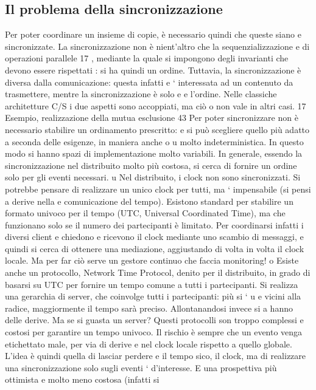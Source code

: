 \documentclass[a4paper,12pt]{article}
\begin{document}
\subsection{Il problema della sincronizzazione}
Per poter coordinare un insieme di copie, è necessario quindi che queste siano
e
sincronizzate. La sincronizzazione non è nient'altro che la sequenzializzazione
e
di operazioni parallele 17 , mediante la quale si impongono degli invarianti che
devono essere rispettati : si ha quindi un ordine.
Tuttavia, la sincronizzazione è diversa dalla comunicazione: questa infatti
e
` interessata ad un contenuto da trasmettere, mentre la sincronizzazione è solo
e
e
l'ordine. Nelle classiche architetture C/S i due aspetti sono accoppiati, ma ciò
o
non vale in altri casi.
17 Esempio,
realizzazione della mutua esclusione
43
Per poter sincronizzare non è necessario stabilire un ordinamento prescritto:
e
si può scegliere quello più adatto a seconda delle esigenze, in maniera anche
o
u
molto indeterministica. In questo modo si hanno spazi di implementazione
molto variabili. In generale, essendo la sincronizzazione nel distribuito molto
più costosa, si cerca di fornire un ordine solo per gli eventi necessari.
u
Nel distribuito, i clock non sono sincronizzati. Si potrebbe pensare di realizzare un unico clock per tutti, ma `
impensabile (si pensi a derive nella
e
comunicazione del tempo). Esistono standard per stabilire un formato univoco per il tempo (UTC, Universal Coordinated
Time), ma che funzionano solo
se il numero dei partecipanti è limitato. Per coordinarsi infatti i diversi client
e
chiedono e ricevono il clock mediante uno scambio di messaggi, e quindi si cerca
di ottenere una mediazione, aggiustando di volta in volta il clock locale. Ma per
far ciò serve un gestore continuo che faccia monitoring!
o
Esiste anche un protocollo, Network Time Protocol, denito per il distribuito,
in grado di basarsi su UTC per fornire un tempo comune a tutti i partecipanti.
Si realizza una gerarchia di server, che coinvolge tutti i partecipanti: più si `
u e
vicini alla radice, maggiormente il tempo sarà preciso. Allontanandosi invece si
a
hanno delle derive. Ma se si guasta un server?
Questi protocolli son troppo complessi e costosi per garantire un tempo univoco. Il rischio è sempre che un evento venga
etichettato male, per via di derive
e
nel clock locale rispetto a quello globale. L'idea è quindi quella di lasciar perdere
e
il tempo sico, il clock, ma di realizzare una sincronizzazione solo sugli eventi
`
d'interesse. E una prospettiva più ottimista e molto meno costosa (infatti si
\end{document}
